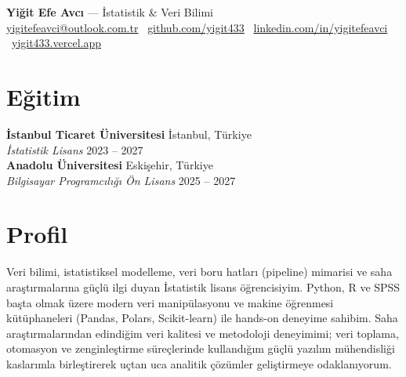 \documentclass[10pt,a4paper]{extarticle}
\begin{document}
\begin{center}
    \begin{minipage}{\textwidth}
        \centering
        {\LARGE\textbf{Yiğit Efe Avcı}} \hspace{4pt} {\Large --- \hspace{4pt}İstatistik \& Veri Bilimi}\\[8pt]
        \href{mailto:yigitefeavci@outlook.com.tr}{yigitefeavci@outlook.com.tr} \textbullet\
        \href{https://github.com/yigit433}{github.com/yigit433} \textbullet\
        \href{https://linkedin.com/in/yigitefeavci}{linkedin.com/in/yigitefeavci} \textbullet\
        \href{https://yigit433.vercel.app}{yigit433.vercel.app}
    \end{minipage}
\end{center}

\section{Eğitim}
\textbf{İstanbul Ticaret Üniversitesi} \hfill İstanbul, Türkiye\\
\textit{İstatistik Lisans} \hfill 2023 -- 2027\\
\textbf{Anadolu Üniversitesi} \hfill Eskişehir, Türkiye\\
\textit{Bilgisayar Programcılığı Ön Lisans} \hfill 2025 -- 2027\\

\section{Profil}
Veri bilimi, istatistiksel modelleme, veri boru hatları (pipeline) mimarisi ve saha araştırmalarına güçlü ilgi duyan İstatistik lisans öğrencisiyim. Python, R ve SPSS başta olmak üzere modern veri manipülasyonu ve makine öğrenmesi kütüphaneleri (Pandas, Polars, Scikit-learn) ile hands-on deneyime sahibim. Saha araştırmalarından edindiğim veri kalitesi ve metodoloji deneyimimi; veri toplama, otomasyon ve zenginleştirme süreçlerinde kullandığım güçlü yazılım mühendisliği kaslarımla birleştirerek uçtan uca analitik çözümler geliştirmeye odaklanıyorum.
\end{document}
